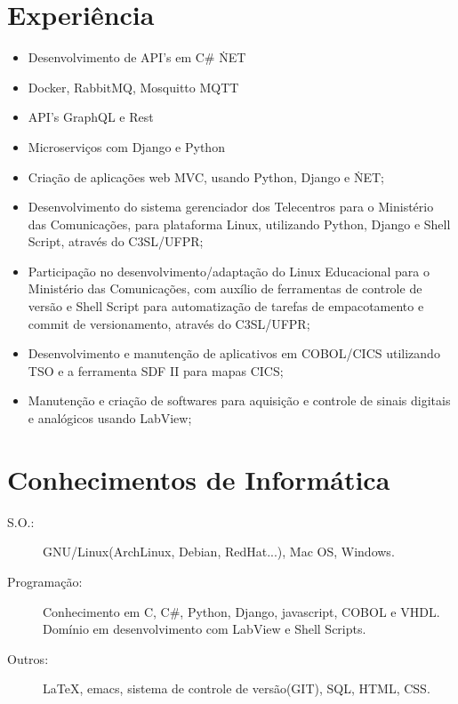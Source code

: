 \documentclass[pdftex, a4paper, 11pt]{article}
\begin{document}
\section*{Experiência}
\begin{itemize}
  \item Desenvolvimento de API's em C\# \/ \.NET
  \item Docker, RabbitMQ, Mosquitto MQTT
  \item API's GraphQL e Rest
  \item Microserviços com Django e Python
  \item Criação de aplicações web MVC, usando Python, Django e \.NET;
  \item Desenvolvimento do sistema gerenciador dos Telecentros para o Ministério das Comunicações, para plataforma Linux, utilizando Python, Django e Shell Script, através do C3SL/UFPR;
  \item Participação no desenvolvimento/adaptação do Linux Educacional para o Ministério das Comunicações, com auxílio de ferramentas de controle de versão e Shell Script para automatização de tarefas de empacotamento e commit de versionamento, através do C3SL/UFPR;
  \item Desenvolvimento e manutenção de aplicativos em COBOL/CICS utilizando TSO e a ferramenta SDF II para mapas CICS;
  \item Manutenção e criação de softwares para aquisição e controle de sinais digitais e analógicos usando LabView; %
\end{itemize}

\section*{Conhecimentos de Informática}
\begin{description}
  \item[S.O.:] GNU/Linux(ArchLinux, Debian, RedHat...), Mac OS, Windows.
  \item[Programação:] Conhecimento em C, C\#, Python, Django, javascript, COBOL e VHDL. Domínio em desenvolvimento com LabView e Shell Scripts.
  \item[Outros:] \LaTeX, emacs, sistema de controle de versão(GIT), SQL, HTML, CSS.
\end{description}
\end{document}
